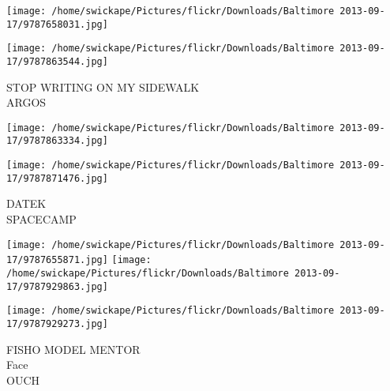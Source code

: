 \documentclass[10pt,letterpaper]{article}
\begin{document}
\texttt{[image: /home/swickape/Pictures/flickr/Downloads/Baltimore 2013-09-17/9787658031.jpg]}

\vspace{0.25in}
\texttt{[image: /home/swickape/Pictures/flickr/Downloads/Baltimore 2013-09-17/9787863544.jpg]}

STOP WRITING ON MY SIDEWALK\\
ARGOS\\
\pagebreak

\texttt{[image: /home/swickape/Pictures/flickr/Downloads/Baltimore 2013-09-17/9787863334.jpg]}

\vspace{0.25in}
\texttt{[image: /home/swickape/Pictures/flickr/Downloads/Baltimore 2013-09-17/9787871476.jpg]}

DATEK\\
SPACECAMP\\
\pagebreak

\texttt{[image: /home/swickape/Pictures/flickr/Downloads/Baltimore 2013-09-17/9787655871.jpg]}
\texttt{[image: /home/swickape/Pictures/flickr/Downloads/Baltimore 2013-09-17/9787929863.jpg]}

\texttt{[image: /home/swickape/Pictures/flickr/Downloads/Baltimore 2013-09-17/9787929273.jpg]}

FISHO MODEL MENTOR\\
Face\\
OUCH\\
\pagebreak
\end{document}
